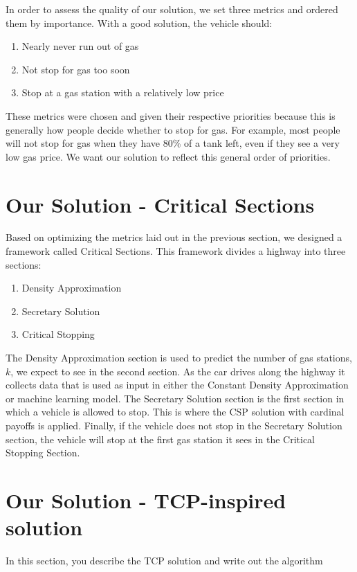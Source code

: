 \documentclass[conference]{IEEEtran}
\theoremstyle{definition}
\begin{document}
In order to assess the quality of our solution, we set three metrics and ordered them by importance. With a good solution, the vehicle should:

\begin{enumerate}
\item Nearly never run out of gas
\item Not stop for gas too soon
\item Stop at a gas station with a relatively low price
\end{enumerate}

These metrics were chosen and given their respective priorities because this is generally how people decide whether to stop for gas. For example, most people will not stop for gas when they have 80\% of a tank left, even if they see a very low gas price. We want our solution to reflect this general order of priorities.

\section{Our Solution - Critical Sections}
Based on optimizing the metrics laid out in the previous section, we designed a framework called Critical Sections. This framework divides a highway into three sections:
\begin{enumerate}
    \item Density Approximation
    \item Secretary Solution
    \item Critical Stopping 
\end{enumerate}
The Density Approximation section is used to predict the number of gas stations, $k$, we expect to see in the second section. As the car drives along the highway it collects data that is used as input in either the Constant Density Approximation or machine learning model. The Secretary Solution section is the first section in which a vehicle is allowed to stop. This is where the CSP solution with cardinal payoffs is applied. Finally, if the vehicle does not stop in the Secretary Solution section, the vehicle will stop at the first gas station it sees in the Critical Stopping Section. 

\section{Our Solution - TCP-inspired solution}
{\color{red} In this section, you describe the TCP solution and write out the algorithm}
\end{document}

